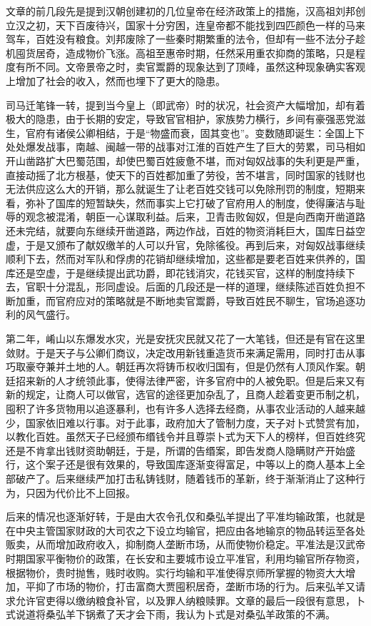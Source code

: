 \documentclass[12pt,a4paper]{ctexart}
\begin{document}
文章的前几段先是提到汉朝创建初的几位皇帝在经济政策上的措施，汉高祖刘邦创立汉之初，天下百废待兴，国家十分穷困，连皇帝都不能找到四匹颜色一样的马来驾车，百姓没有粮食。刘邦废除了一些秦时期繁重的法令，但却有一些不法分子趁机囤货居奇，造成物价飞涨。高祖至惠帝时期，任然采用重农抑商的策略，只是程度有所不同。文帝景帝之时，卖官鬻爵的现象达到了顶峰，虽然这种现象确实客观上增加了社会的收入，然而也埋下了更大的隐患。

司马迁笔锋一转，提到当今皇上（即武帝）时的状况，社会资产大幅增加，却有着极大的隐患，由于长期的安定，导致官官相护，家族势力横行，乡间有豪强恶党滋生，官府有诸侯公卿相结，于是“物盛而衰，固其变也”。变数随即诞生：全国上下处处爆发战事，南越、闽越一带的战事对江淮的百姓产生了巨大的劳累，司马相如开山凿路扩大巴蜀范围，却使巴蜀百姓疲惫不堪，而对匈奴战事的失利更是严重，直接动摇了北方根基，使天下的百姓都加重了劳役，苦不堪言，同时国家的钱财也无法供应这么大的开销，那么就诞生了让老百姓交钱可以免除刑罚的制度，短期来看，弥补了国库的短暂缺失，然而事实上它打破了官府用人的制度，使得廉洁与耻辱的观念被混淆，朝臣一心谋取利益。后来，卫青击败匈奴，但是向西南开凿道路还未完结，就要向东继续开凿道路，两边作战，百姓的物资消耗巨大，国库日益空虚，于是又颁布了献奴缴羊的人可以升官，免除徭役。再到后来，对匈奴战事继续顺利下去，然而对军队和俘虏的花销却继续增加，这些都是要老百姓来供养的，国库还是空虚，于是继续提出武功爵，即花钱消灾，花钱买官，这样的制度持续下去，官职十分混乱，形同虚设。后面的几段还是一样的道理，继续陈述百姓负担不断加重，而官府应对的策略就是不断地卖官鬻爵，导致百姓民不聊生，官场追逐功利的风气盛行。

第二年，崤山以东爆发水灾，光是安抚灾民就又花了一大笔钱，但还是有官在这里敛财。于是天子与公卿们商议，决定改用新钱重造货币来满足需用，同时打击从事巧取豪夺兼并土地的人。朝廷再次将铸币权收归国有，但是仍然有人顶风作案。朝廷招来新的人才统领此事，使得法律严密，许多官府中的人被免职。但是后来又有新的规定，让商人可以做官，选官的途径更加杂乱了，且商人趁着变更币制之机，囤积了许多货物用以追逐暴利，也有许多人选择去经商，从事农业活动的人越来越少，国家依旧难以行事。对于此事，政府加大了管制力度，天子对卜式赞赏有加，以教化百姓。虽然天子已经颁布缗钱令并且尊崇卜式为天下人的榜样，但百姓终究还是不肯拿出钱财资助朝廷，于是，所谓的告缗案，即告发商人隐瞒财产开始盛行，这个案子还是很有效果的，导致国库逐渐变得富足，中等以上的商人基本上全部破产了。后来继续严加打击私铸钱财，随着钱币的革新，终于渐渐消止了这种行为，只因为代价比不上回报。

后来的情况也逐渐好转，于是由大农令孔仅和桑弘羊提出了平准均输政策，也就是在中央主管国家财政的大司农之下设立均输官，把应由各地输京的物品转运至各处贩卖，从而增加政府收入，抑制商人垄断市场，从而使物价稳定。平准法是汉武帝时期国家平衡物价的政策，在长安和主要城市设立平准官，利用均输官所存物资，根据物价，贵时抛售，贱时收购。实行均输和平准使得京师所掌握的物资大大增加，平抑了市场的物价，打击富商大贾囤积居奇，垄断市场的行为。后来弘羊又请求允许官吏得以缴纳粮食补官，以及罪人纳粮赎罪。文章的最后一段很有意思，卜式说道将桑弘羊下锅煮了天才会下雨，我认为卜式是对桑弘羊政策的不满。
\end{document}
